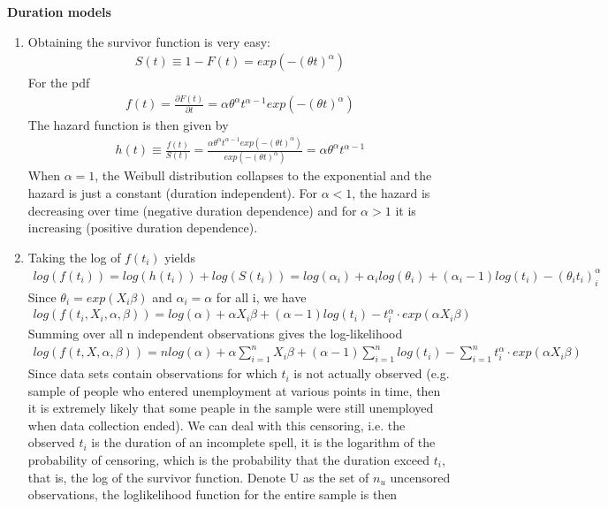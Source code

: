 \documentclass{article}
\begin{document}
\begin{solution}
\textbf{Duration models}

\begin{enumerate}
\item Obtaining the survivor function is very easy:
\begin{align*}
  S(t) \equiv 1-F(t) = exp(-(\theta t)^\alpha)
\end{align*}
For the pdf
\begin{align*}
  f(t) = \frac{\partial F(t)}{\partial t} = \alpha \theta^\alpha t^{\alpha-1} exp(-(\theta t)^\alpha)
\end{align*}
The hazard function is then given by
\begin{align*}
h(t) \equiv \frac{f(t)}{S(t)} = \frac{ \alpha \theta^\alpha t^{\alpha-1} exp(-(\theta t)^\alpha)}{exp(-(\theta t)^\alpha)} = \alpha \theta^\alpha t^{\alpha-1}
\end{align*}
When $\alpha=1$, the Weibull distribution collapses to the exponential and the hazard is just a constant (duration independent). For $\alpha<1$, the hazard is decreasing over time (negative duration dependence) and for $\alpha>1$ it is increasing (positive duration dependence).
\item Taking the log of $f(t_i)$ yields
\begin{align*}
  log(f(t_i)) = log\left(h(t_i)\right) + log\left(S(t_i)\right) = log(\alpha_i) +\alpha_i log(\theta_i) + (\alpha_i-1)log(t_i) -(\theta_i t_i)^\alpha_i
\end{align*}
Since $\theta_i = exp(X_i\beta)$ and $\alpha_i=\alpha$ for all i, we have
\begin{align*}
  log(f(t_i,X_i,\alpha,\beta)) = log(\alpha) +\alpha X_i \beta + (\alpha-1)log(t_i) - t_i^\alpha \cdot exp(\alpha X_i \beta)
\end{align*}
Summing over all n independent observations gives the log-likelihood
\begin{align*}
log(f(t,X,\alpha,\beta)) = n log(\alpha) + \alpha \sum_{i=1}^{n} X_i\beta + (\alpha-1) \sum_{i=1}^{n}log(t_i) - \sum_{i=1}^{n} t_i^\alpha \cdot exp(\alpha X_i \beta)
\end{align*}
Since data sets contain observations for which $t_i$ is not actually observed (e.g. sample of people who entered unemployment at various points in time, then it is extremely likely that some peaple in the sample were still unemployed when data collection ended). We can deal with this censoring, i.e. the observed $t_i$ is the duration of an incomplete spell, it is the logarithm of the probability of censoring, which is the probability that the duration exceed $t_i$, that is, the log of the survivor function. Denote U as the set of $n_u$ uncensored observations, the loglikelihood function for the entire sample is then

\end{enumerate}
\end{solution}
\end{document}

